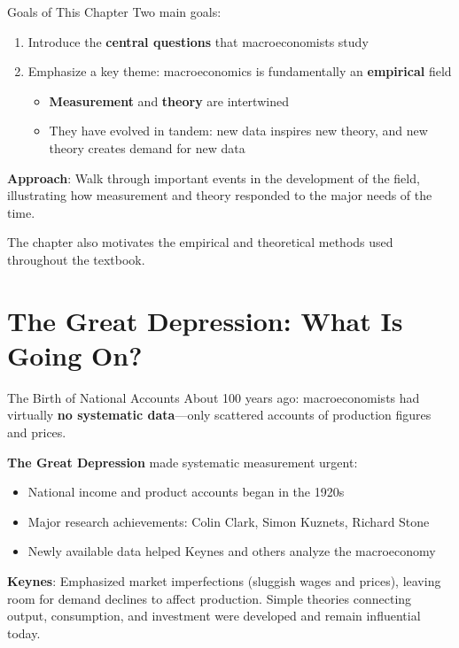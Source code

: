 \documentclass[blue]{beamer}
\begin{document}
\begin{frame}{Goals of This Chapter}
	Two main goals:
	
	\bigskip
	\begin{enumerate}
		\item Introduce the \textbf{central questions} that macroeconomists study
		\item Emphasize a key theme: macroeconomics is fundamentally an \textbf{empirical} field
		\begin{itemize}
			\item \textbf{Measurement} and \textbf{theory} are intertwined
			\item They have evolved in tandem: new data inspires new theory, and new theory creates demand for new data
		\end{itemize}
	\end{enumerate}
	
	\bigskip
	\textbf{Approach}: Walk through important events in the development of the field, illustrating how measurement and theory responded to the major needs of the time.
	
	\bigskip
	The chapter also motivates the empirical and theoretical {methods} used throughout the textbook.
\end{frame}


\section{The Great Depression: What Is Going On?}

\begin{frame}{The Birth of National Accounts}
	About 100 years ago: macroeconomists had virtually \textbf{no systematic data}---only scattered accounts of production figures and prices.
	
	\textbf{The Great Depression} made systematic measurement urgent:
	\begin{itemize}
		\item National income and product accounts began in the 1920s
		\item Major research achievements: Colin Clark, Simon Kuznets, Richard Stone
		\item Newly available data helped Keynes and others analyze the macroeconomy
	\end{itemize}
	\textbf{Keynes}: Emphasized market imperfections (sluggish wages and prices), leaving room for demand declines to affect production. Simple theories connecting output, consumption, and investment were developed and remain influential today.
\end{frame}
\end{document}
